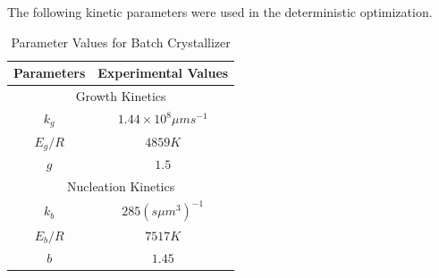 The following kinetic parameters were used in the deterministic optimization. 

\begin{center}
\begin{table}[!h]
\centering
\caption{Parameter Values for Batch Crystallizer\cite{hu,paeng}}
\begin{tabular}{|c|c|}
\hline
Parameters & Experimental Values \\
\hline
\multicolumn{2}{|c|}{Growth Kinetics} \\
\hline
$k_{g}$ & $1.44\times10^{8} \mu m s^{-1}$ \\
$E_{g}/R$ & $4859K$ \\
$g$ & $1.5$ \\
\hline
\multicolumn{2}{|c|}{Nucleation Kinetics} \\
\hline
$k_{b}$ & $285 (s \mu m^{3})^{-1}$ \\ 
$E_{b}/R$ & $7517K$ \\
$b$ & $1.45$ \\
\hline
\end{tabular}
\label{Table1}
\end{table}
\end{center}

